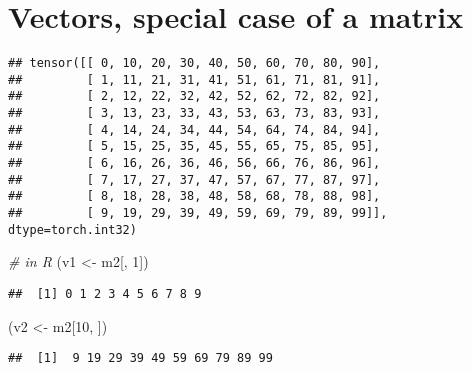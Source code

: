 \documentclass[]{book}
\newenvironment{Shaded}{\begin{snugshade}}{\end{snugshade}}
\newcommand{\CommentTok}[1]{\textcolor[rgb]{0.56,0.35,0.01}{\textit{#1}}}
\newcommand{\DataTypeTok}[1]{\textcolor[rgb]{0.13,0.29,0.53}{#1}}
\newcommand{\DecValTok}[1]{\textcolor[rgb]{0.00,0.00,0.81}{#1}}
\newcommand{\KeywordTok}[1]{\textcolor[rgb]{0.13,0.29,0.53}{\textbf{#1}}}
\newcommand{\NormalTok}[1]{#1}
\newcommand{\OperatorTok}[1]{\textcolor[rgb]{0.81,0.36,0.00}{\textbf{#1}}}
\newcommand{\StringTok}[1]{\textcolor[rgb]{0.31,0.60,0.02}{#1}}
\begin{document}
\hypertarget{vectors-special-case-of-a-matrix}{%
\section{Vectors, special case of a matrix}\label{vectors-special-case-of-a-matrix}}

\begin{Shaded}
\end{Shaded}

\begin{verbatim}
## tensor([[ 0, 10, 20, 30, 40, 50, 60, 70, 80, 90],
##         [ 1, 11, 21, 31, 41, 51, 61, 71, 81, 91],
##         [ 2, 12, 22, 32, 42, 52, 62, 72, 82, 92],
##         [ 3, 13, 23, 33, 43, 53, 63, 73, 83, 93],
##         [ 4, 14, 24, 34, 44, 54, 64, 74, 84, 94],
##         [ 5, 15, 25, 35, 45, 55, 65, 75, 85, 95],
##         [ 6, 16, 26, 36, 46, 56, 66, 76, 86, 96],
##         [ 7, 17, 27, 37, 47, 57, 67, 77, 87, 97],
##         [ 8, 18, 28, 38, 48, 58, 68, 78, 88, 98],
##         [ 9, 19, 29, 39, 49, 59, 69, 79, 89, 99]], dtype=torch.int32)
\end{verbatim}

\begin{Shaded}
\begin{Highlighting}[]
\CommentTok{# in R}
\NormalTok{(v1 <-}\StringTok{ }\NormalTok{m2[, }\DecValTok{1}\NormalTok{])}
\end{Highlighting}
\end{Shaded}

\begin{verbatim}
##  [1] 0 1 2 3 4 5 6 7 8 9
\end{verbatim}

\begin{Shaded}
\begin{Highlighting}[]
\NormalTok{(v2 <-}\StringTok{ }\NormalTok{m2[}\DecValTok{10}\NormalTok{, ])}
\end{Highlighting}
\end{Shaded}

\begin{verbatim}
##  [1]  9 19 29 39 49 59 69 79 89 99
\end{verbatim}
\end{document}
